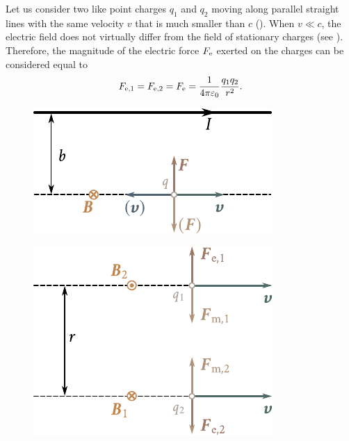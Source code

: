Let us consider two like point charges $q_1$ and $q_2$ moving along parallel straight lines with the same velocity $v$ that is much smaller than $c$ (). When $v\ll c$, the electric field does not virtually differ from the field of stationary charges (see ). Therefore, the magnitude of the electric force $F_{\text{e}}$ exerted on the charges can be considered equal to
\begin{equation}\label{eq:6_37}
    F_{\text{e,$1$}} = F_{\text{e,$2$}} = F_{\text{e}} = \frac{1}{4\pi\varepsilon_0} \frac{q_1 q_2}{r^2}.
\end{equation}

\begin{figure}[t]
	\begin{minipage}[t]{0.48\linewidth}
		\begin{center}
			\includegraphics[scale=1]{figures/ch_06/fig_6_7.pdf}
			\caption[]{}
			\label{fig:6_7}
		\end{center}
	\end{minipage}
	\hfill{ }%
	\begin{minipage}[t]{0.48\linewidth}
		\begin{center}
			\includegraphics[scale=1]{figures/ch_06/fig_6_8.pdf}
			\caption[]{}
			\label{fig:6_8}
		\end{center}
	\end{minipage}
\vspace{-0.4cm}
\end{figure}

